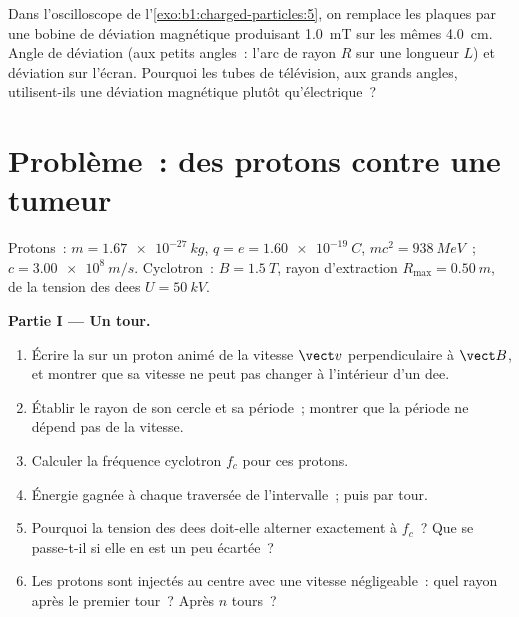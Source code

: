 \begin{exercise}[$\star\star\star$]\label{exo:b1:charged-particles:12}
Dans l'oscilloscope de l'\cref{exo:b1:charged-particles:5}, on remplace
les plaques par une bobine de déviation magnétique produisant
\qty{1.0}{mT} sur les mêmes \qty{4.0}{cm}. Angle de déviation (aux
petits angles~: l'arc de rayon $R$ sur une longueur $L$) et déviation sur
l'écran. Pourquoi les tubes de télévision, aux grands angles, utilisent-ils
une déviation magnétique plutôt qu'électrique~?
\end{exercise}

\section{Problème~: des protons contre une tumeur}

\begin{problem}
\label{pb:b1:charged-particles:1}
Protons~: $m = \qty{1.67e-27}{kg}$, $q = e = \qty{1.60e-19}{C}$, $mc^2 =
\qty{938}{MeV}$~; $c = \qty{3.00e8}{m/s}$. Cyclotron~: $B = \qty{1.5}{T}$,
rayon d'extraction $R_{\max} = \qty{0.50}{m}$,  de la tension
des dees $U = \qty{50}{kV}$.

\medskip
\noindent\textbf{Partie I --- Un tour.}
\begin{enumerate}
  \item Écrire la  sur un proton animé de la vitesse
        $\vect v$ perpendiculaire à $\vect B$, et montrer que sa vitesse
        ne peut pas changer à l'intérieur d'un dee.
  \item Établir le rayon de son cercle et sa période~; montrer que la
        période ne dépend pas de la vitesse.
  \item Calculer la fréquence cyclotron $f_c$ pour ces protons.
  \item Énergie gagnée à chaque traversée de l'intervalle~; puis par tour.
  \item Pourquoi la tension des dees doit-elle alterner exactement à
        $f_c$~? Que se passe-t-il si elle en est un peu écartée~?
  \item Les protons sont injectés au centre avec une vitesse
        négligeable~: quel rayon après le premier tour~? Après $n$ tours~?
\end{enumerate}


\end{problem}
